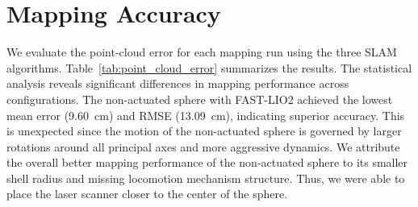 \documentclass[english, bachelor, utf8]{base/thesis_telematics}
\begin{document}
\section{Mapping Accuracy}
We evaluate the point-cloud error for each mapping run using the three SLAM algorithms. 
Table~\ref{tab:point_cloud_error} summarizes the results.
The statistical analysis reveals significant differences in mapping performance across configurations. 
The non-actuated sphere with FAST-LIO2 achieved the lowest mean error (\SI{9.60}{\centi\meter}) and RMSE (\SI{13.09}{\centi\meter}), indicating superior accuracy. 
This is unexpected since the motion of the non-actuated sphere is governed by larger rotations around all principal axes and more aggressive dynamics.
We attribute the overall better mapping performance of the non-actuated sphere to its smaller shell radius and missing locomotion mechanism structure.
Thus, we were able to place the laser scanner closer to the center of the sphere.
\clearpage
\end{document}
